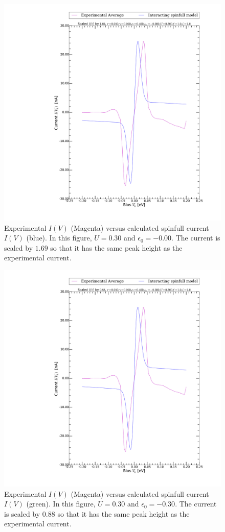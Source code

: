 \begin{figure}[h]
    \centering
    \includegraphics[width=.95\textwidth, clip=true, trim=11cm 2cm 2cm 0cm]{pdf/fit/fit_spinfull_0.pdf}
    \caption{Experimental $I(V)$ (Magenta) versus calculated spinfull current $I(V)$ (blue). In this figure, $U=0.30$ and $\epsilon_0 = -0.00$. The current is scaled by $1.69$ so that it has the same peak height as the experimental current.}
    \label{fig:fitspinfull0}
\end{figure}
\begin{figure}[h]
    \centering
    \includegraphics[width=.95\textwidth, clip=true, trim=11cm 2cm 2cm 0cm]{pdf/fit/fit_spinfull_1.pdf}
    \caption{Experimental $I(V)$ (Magenta) versus calculated spinfull current $I(V)$ (green). In this figure, $U=0.30$ and $\epsilon_0 = -0.30$. The current is scaled by $0.88$ so that it has the same peak height as the experimental current.}
    \label{fig:fitspinfull1}
\end{figure}
